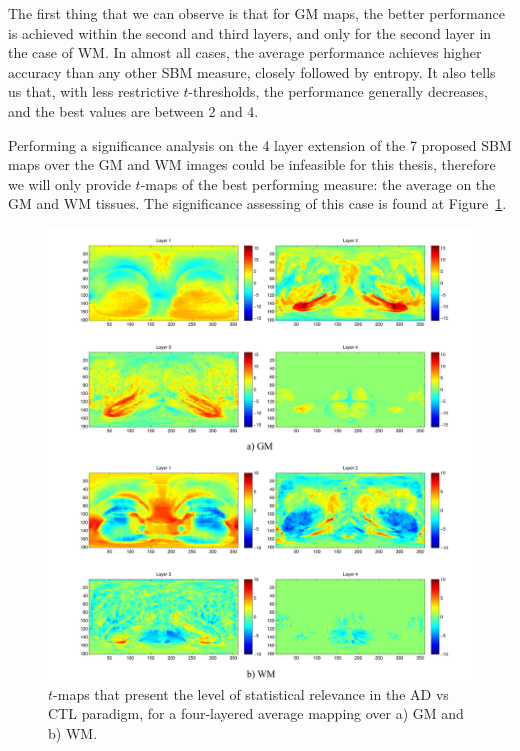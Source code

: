 The first thing that we can observe is that for \ac{GM} maps, the better performance is achieved within the second and third layers, and only for the second layer in the case of \ac{WM}. In almost all cases, the average performance achieves higher accuracy than any other \ac{SBM} measure, closely followed by entropy. It also tells us that, with less restrictive $t$-thresholds, the performance generally decreases, and the best values are between 2 and 4. 

Performing a significance analysis on the 4 layer extension of the 7 proposed \ac{SBM} maps over the \ac{GM} and \ac{WM} images could be infeasible for this thesis, therefore we will only provide $t$-maps of the best performing measure: the average on the \ac{GM} and \ac{WM} tissues. The significance assessing of this case is found at Figure~\ref{fig:tmaplayered}.

\begin{figure}[htp]
	\centering
	\includegraphics[width=\textwidth]{Graphics/ch6/08-Tmap4LayAverage}
	\caption[$t$-maps that present the level of statistical relevance in the \acs{AD} vs \acs{CTL} paradigm.]{$t$-maps that present the level of statistical relevance in the \acs{AD} vs \acs{CTL} paradigm, for a four-layered average mapping over a) \ac{GM} and b) \ac{WM}. }
	\label{fig:tmaplayered}
\end{figure} 

